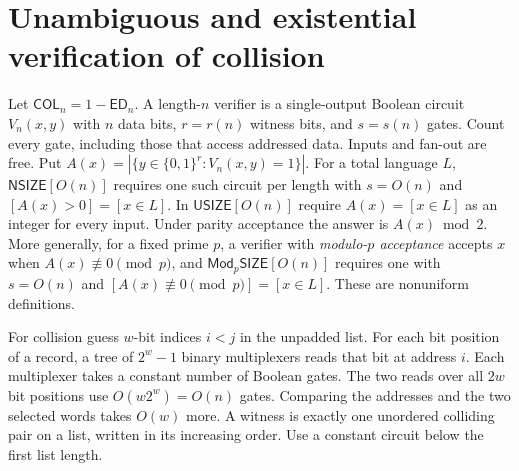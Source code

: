 \documentclass[11pt]{article}
\theoremstyle{definition}
\theoremstyle{remark}
\newcommand{\ED}{\mathsf{ED}}
\newcommand{\USIZE}{\mathsf{USIZE}}
\newcommand{\NSIZE}{\mathsf{NSIZE}}
\newcommand{\ModSIZE}[1]{\mathsf{Mod}_{#1}\mathsf{SIZE}}
\begin{document}
\section{Unambiguous and existential verification of collision}\label{sec:ambiguity}
Let $\mathsf{COL}_n=1-\ED_n$. A length-$n$ verifier is a single-output
Boolean circuit $V_n(x,y)$ with $n$ data bits, $r=r(n)$ witness bits,
and $s=s(n)$ gates. Count every gate, including those that access
addressed data. Inputs and fan-out are free. Put
$A(x)=|\{y\in\{0,1\}^r:V_n(x,y)=1\}|$. For a total language $L$,
$\NSIZE[O(n)]$ requires one such circuit per length with $s=O(n)$ and
$[A(x)>0]=[x\in L]$. In $\USIZE[O(n)]$ require $A(x)=[x\in L]$
as an integer for every input. Under parity acceptance the answer is
$A(x)\bmod2$. More generally, for a fixed prime $p$, a verifier with
\emph{modulo-$p$ acceptance} accepts $x$ when $A(x)\not\equiv0\pmod p$,
and $\ModSIZE{p}[O(n)]$ requires one with $s=O(n)$ and
$[A(x)\not\equiv0\pmod p]=[x\in L]$. These are nonuniform definitions.

For collision guess $w$-bit indices $i<j$ in the unpadded list.
For each bit position of a record, a tree of $2^w-1$ binary
multiplexers reads that bit at address $i$. Each multiplexer takes
a constant number of Boolean gates. The two reads over all $2w$ bit
positions use $O(w2^w)=O(n)$ gates. Comparing the addresses and the
two selected words takes $O(w)$ more. A witness is exactly one
unordered colliding pair on a list, written in its increasing order.
Use a constant circuit below the first list length.
\end{document}
